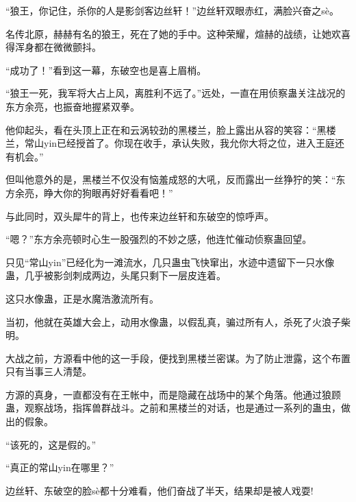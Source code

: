 \begin{this_body}
“狼王，你记住，杀你的人是影剑客边丝轩！”边丝轩双眼赤红，满脸兴奋之sè。

名传北原，赫赫有名的狼王，死在了她的手中。这种荣耀，煊赫的战绩，让她欢喜得浑身都在微微颤抖。

“成功了！”看到这一幕，东破空也是喜上眉梢。

“狼王一死，我军将大占上风，离胜利不远了。”远处，一直在用侦察蛊关注战况的东方余亮，也振奋地握紧双拳。

他仰起头，看在头顶上正在和云涡较劲的黑楼兰，脸上露出从容的笑容：“黑楼兰，常山yin已经授首了。你现在收手，承认失败，我允你大将之位，进入王庭还有机会。”

但叫他意外的是，黑楼兰不仅没有恼羞成怒的大吼，反而露出一丝狰狞的笑：“东方余亮，睁大你的狗眼再好好看看吧！”

与此同时，双头犀牛的背上，也传来边丝轩和东破空的惊呼声。

“嗯？”东方余亮顿时心生一股强烈的不妙之感，他连忙催动侦察蛊回望。

只见“常山yin”已经化为一滩流水，几只蛊虫飞快窜出，水迹中遗留下一只水像蛊，几乎被影剑刺成两边，头尾只剩下一层皮连着。

这只水像蛊，正是水魔浩激流所有。

当初，他就在英雄大会上，动用水像蛊，以假乱真，骗过所有人，杀死了火浪子柴明。

大战之前，方源看中他的这一手段，便找到黑楼兰密谋。为了防止泄露，这个布置只有当事三人清楚。

方源的真身，一直都没有在王帐中，而是隐藏在战场中的某个角落。他通过狼顾蛊，观察战场，指挥兽群战斗。之前和黑楼兰的对话，也是通过一系列的蛊虫，做出的假象。

“该死的，这是假的。”

“真正的常山yin在哪里？”

边丝轩、东破空的脸sè都十分难看，他们奋战了半天，结果却是被人戏耍!

\end{this_body}

